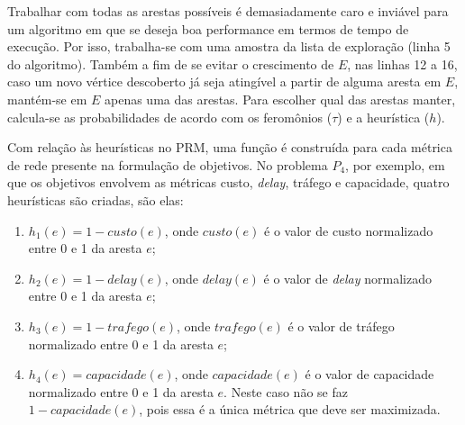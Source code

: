 Trabalhar com todas as arestas possíveis é demasiadamente caro e inviável para um algoritmo em que se deseja boa performance em termos de tempo de execução. Por isso, trabalha-se com uma amostra da lista de exploração (linha 5 do algoritmo). Também a fim de se evitar o crescimento de $E$, nas linhas 12 a 16, caso um novo vértice descoberto já seja atingível a partir de alguma aresta em $E$, mantém-se em $E$ apenas uma das arestas. Para escolher qual das arestas manter, calcula-se as probabilidades de acordo com os feromônios ($\tau$) e a heurística ($h$).

Com relação às heurísticas no PRM, uma função é construída para cada métrica de rede presente na formulação de objetivos. No problema $P_4$, por exemplo, em que os objetivos envolvem as métricas custo, \textit{delay}, tráfego e capacidade, quatro heurísticas são criadas, são elas:

\begin{enumerate}
	\item $h_1(e) = 1 - custo(e)$, onde $custo(e)$ é o valor de custo normalizado entre 0 e 1 da aresta $e$;
	\item $h_2(e) = 1 - delay(e)$, onde $delay(e)$ é o valor de \textit{delay} normalizado entre 0 e 1 da aresta $e$;
	\item $h_3(e) = 1 - trafego(e)$, onde $trafego(e)$ é o valor de tráfego normalizado entre 0 e 1 da aresta $e$;
	\item $h_4(e) = capacidade(e)$, onde $capacidade(e)$ é o valor de capacidade normalizado entre 0 e 1 da aresta $e$. Neste caso não se faz $1 - capacidade(e)$, pois essa é a única métrica que deve ser maximizada.
\end{enumerate}